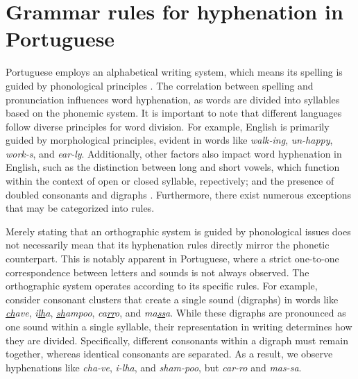 \documentclass{article}
\begin{document}
\section{Grammar rules for hyphenation in Portuguese}\label{sec-grammar-port}

Portuguese employs an alphabetical writing system, which means its spelling is
guided by phonological principles \parencite{cagliari2015}. The correlation between
spelling and pronunciation influences word hyphenation, as words are divided
into syllables based on the phonemic system. It is important to note that
different languages follow diverse principles for word division. For example,
English is primarily guided by morphological principles, evident in words like
\emph{walk-ing}, \emph{un-happy}, \emph{work-s}, and \emph{ear-ly}.
Additionally, other factors also impact word hyphenation in English, such as 
the distinction between long and short vowels, which function within the context
of open or closed syllable, repectively; and the presence of doubled consonants and
digraphs \parencite{lin2011,yavas2020}. 
Furthermore, there exist numerous exceptions that may be categorized into rules.

Merely stating that an orthographic system is guided by phonological issues
does not necessarily mean that its hyphenation rules directly mirror the
phonetic counterpart. This is notably apparent in Portuguese, where a strict
one-to-one correspondence between letters and sounds is not always observed.
The orthographic system operates according to its specific rules. For example,
consider consonant clusters that create a single sound (digraphs) in words like
\emph{\underline{ch}ave}, \emph{i\underline{lh}a}, \emph{\underline{sh}ampoo}, \emph{ca\underline{rr}o}, and \emph{ma\underline{ss}a}.
While these digraphs are pronounced as one sound within a single syllable,
their representation in writing determines how they are divided. Specifically,
different consonants within a digraph must remain together, whereas identical
consonants are separated. As a result, we observe hyphenations like
\emph{cha-ve}, \emph{i-lha}, and \emph{sham-poo}, but \emph{car-ro} and \emph{mas-sa}. 

\end{document}
